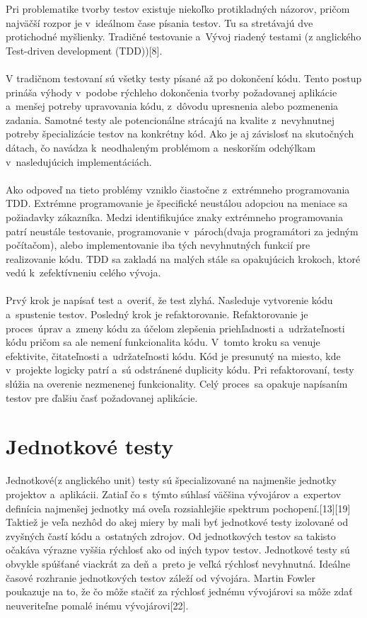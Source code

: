 \documentclass[
  digital, %
  table,   %
oneside,
  nolof,     %
  nolot,     %
]{fithesis3}
\begin{document}
Pri problematike tvorby testov existuje niekoľko protikladných názorov, pričom najväčší rozpor je v~ideálnom čase písania testov. Tu sa stretávajú dve protichodné myšlienky. Tradičné testovanie a~Vývoj riadený testami (z anglického  Test-driven development (TDD))[8]. \paragraph{}
V tradičnom testovaní sú všetky testy písané až po dokončení kódu. Tento postup prináša výhody v~podobe rýchleho dokončenia tvorby požadovanej aplikácie a~menšej potreby upravovania kódu, z~dôvodu upresnenia alebo pozmenenia zadania. Samotné testy ale potencionálne strácajú na kvalite z~nevyhnutnej  potreby špecializácie testov na konkrétny kód. Ako je aj závislosť na skutočných dátach, čo navádza k~neodhaleným problémom a~neskorším odchýlkam v~nasledujúcich implementáciách.\paragraph{}
Ako odpoveď na tieto problémy vzniklo čiastočne z~extrémneho programovania TDD. Extrémne programovanie je špecifické neustálou adopciou na meniace sa požiadavky zákazníka. Medzi identifikujúce znaky extrémneho programovania patrí neustále testovanie, programovanie v~pároch(dvaja programátori za jedným počítačom), alebo implementovanie  iba tých nevyhnutných funkcií pre realizovanie kódu. TDD sa zakladá na malých stále sa opakujúcich krokoch, ktoré vedú k~zefektívneniu celého vývoja. \paragraph{}
Prvý krok je napísať test a~overiť, že test zlyhá. Nasleduje vytvorenie kódu a~spustenie testov. Posledný krok je refaktorovanie. Refaktorovanie je proces~úprav a~zmeny kódu za účelom zlepšenia priehľadnosti a~udržateľnosti kódu pričom sa ale nemení funkcionalita kódu. V~tomto kroku sa venuje efektivite, čitateľnosti a~udržateľnosti kódu. Kód je presunutý na miesto, kde v~projekte logicky patrí a~sú odstránené duplicity kódu. Pri refaktorovaní, testy slúžia na overenie nezmenenej funkcionality. Celý proces~sa opakuje napísaním testov pre ďalšiu časť požadovanej aplikácie.

\section{Jednotkové testy}
Jednotkové(z anglického unit) testy sú špecializované na najmenšie jednotky projektov a~aplikácii. Zatiaľ čo s~týmto súhlasí väčšina vývojárov a~expertov definícia najmenšej jednotky má oveľa rozsiahlejšie spektrum pochopení.[13][19] Taktiež je veľa nezhôd do akej miery by mali byť jednotkové testy izolované od zvyšných častí kódu a~ostatných zdrojov. Od jednotkových testov sa takisto očakáva výrazne vyššia rýchlosť ako od iných typov testov. Jednotkové testy sú obvykle spúšťané viackrát za deň a~preto je veľká rýchlosť nevyhnutná. Ideálne časové rozhranie jednotkových testov záleží od vývojára. Martin Fowler poukazuje na to, že čo môže stačiť za rýchlosť jednému vývojárovi sa môže zdať neuveriteľne pomalé inému vývojárovi[22].
\end{document}
